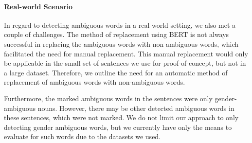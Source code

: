 \paragraph{Real-world Scenario}
In regard to detecting ambiguous words in a real-world setting, we also met a couple of challenges. The method of replacement using BERT is not always successful in replacing the ambiguous words with non-ambiguous words, which facilitated the need for manual replacement. This manual replacement would only be applicable in the small set of sentences we use for proof-of-concept, but not in a large dataset. Therefore, we outline the need for an automatic method of replacement of ambiguous words with non-ambiguous words. 

Furthermore, the marked ambiguous words in the sentences were only gender-ambiguous nouns. However, there may be other detected ambiguous words in these sentences, which were not marked. We do not limit our approach to only detecting gender ambiguous words, but we currently have only the means to evaluate for such words due to the datasets we used.



